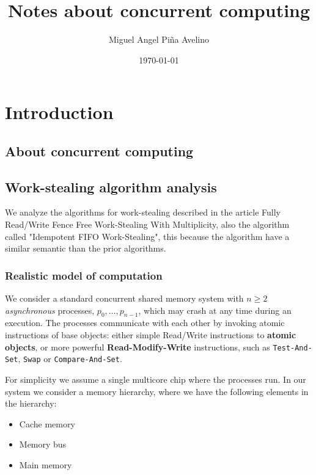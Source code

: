 \documentclass[openany, a4paper]{book}
\author{Miguel Angel Piña Avelino}
\date{\today}
\title{Notes about concurrent computing}
\theoremstyle{break}
\theoremstyle{example}
\theoremstyle{note}
\theoremstyle{break}
\theoremstyle{exercise}
\begin{document}
\maketitle
\tableofcontents


\part{Introduction}
\label{sec:org4353bc1}

\chapter{About concurrent computing}
\label{sec:org91640ba}

\chapter{Work-stealing algorithm analysis}
\label{sec:orgf64c116}

We analyze the algorithms for work-stealing described in the article Fully
Read/Write Fence Free Work-Stealing With Multiplicity, also the algorithm
called "Idempotent FIFO Work-Stealing", this because the algorithm have a
similar semantic than the prior algorithms.

\section{Realistic model of computation}
\label{sec:orga65b4d0}

We consider a standard concurrent shared memory system with \(n \ge 2\)
\emph{asynchronous} processes, \(p_0, \ldots, p_{n-1}\), which may crash at any time
during an execution. The processes communicate with each other by invoking
atomic instructions of base objects: either simple Read/Write instructions to
\textbf{atomic objects}, or more powerful \textbf{Read-Modify-Write} instructions, such as
\texttt{Test-And-Set}, \texttt{Swap} or \texttt{Compare-And-Set}.

For simplicity we assume a single multicore chip where the processes run. In
our system we consider a memory hierarchy, where we have the following
elements in the hierarchy:

\begin{itemize}
\item Cache memory
\item Memory bus
\item Main memory
\end{itemize}
\end{document}
